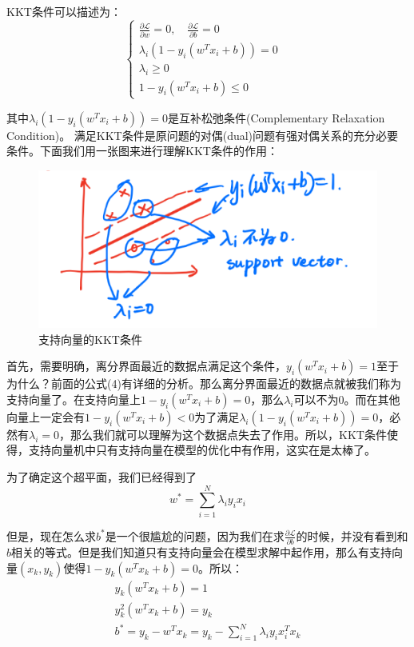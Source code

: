 \documentclass[a4paper]{article}
\begin{document}
KKT条件可以描述为：
\begin{equation}
    \left\{
    \begin{array}{ll}
          \frac{\partial \mathcal{L}}{\partial w} = 0,\quad
          \frac{\partial \mathcal{L}}{\partial b} = 0 & \\
          \lambda_i(1-y_i(w^Tx_i+b)) = 0 & \\
          \lambda_i \geq 0 & \\
          1-y_i(w^Tx_i+b) \leq 0 
    \end{array}
    \right.
\end{equation}

其中$\lambda_i(1-y_i(w^Tx_i+b)) = 0$是互补松弛条件(Complementary Relaxation Condition)。{\color{red} 满足KKT条件是原问题的对偶(dual)问题有强对偶关系的充分必要条件。}下面我们用一张图来进行理解KKT条件的作用：
\begin{figure}[H]
    \centering
    \includegraphics[width=.55\textwidth]{微信图片_20191114112701.png}
    \caption{支持向量的KKT条件}
    \label{fig:my_label_1}
\end{figure}

首先，需要明确，离分界面最近的数据点满足这个条件，$y_i(w^Tx_i+b)=1$至于为什么？前面的公式(4)有详细的分析。那么离分界面最近的数据点就被我们称为支持向量了。在支持向量上$1-y_i(w^Tx_i+b)=0$，那么$\lambda_i$可以不为0。而在其他向量上一定会有$1-y_i(w^Tx_i+b)<0$为了满足$\lambda_i(1-y_i(w^Tx_i+b)) = 0$，必然有$\lambda_i=0$，那么我们就可以理解为这个数据点失去了作用。所以，KKT条件使得，支持向量机中只有支持向量在模型的优化中有作用，这实在是太棒了。

为了确定这个超平面，我们已经得到了
\begin{equation}
    w^\ast = \sum_{i=1}^N \lambda_iy_ix_i
\end{equation}

但是，现在怎么求$b^\ast$是一个很尴尬的问题，因为我们在求$\frac{\partial \mathcal{L}}{\partial b}$的时候，并没有看到和$b$相关的等式。但是我们知道只有支持向量会在模型求解中起作用，那么有支持向量$(x_k,y_k)$使得$1-y_k(w^Tx_k+b)=0$。所以：
\begin{gather}
    y_k(w^Tx_k + b) = 1 \\
    y_k^2(w^Tx_k + b) = y_k \\
    b^\ast = y_k - w^Tx_k = y_k - \sum_{i=1}^N \lambda_iy_ix_i^T x_k
\end{gather}
\end{document}
